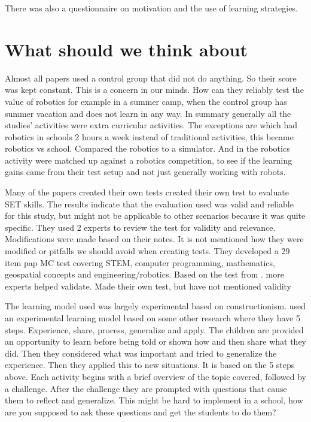 \bigskip\noindent
\cite{nugent2008effect} There was also a questionnaire on motivation and the use of learning strategies.

\section{What should we think about}
Almost all papers used a control group that did not do anything. So their score was kept constant. This is a concern in our minds. How can they reliably test the value of robotics for example in a summer camp, when the control group has summer vacation and does not learn in any way. In summary generally all the studies’ activities were extra curricular activities. The exceptions are \cite{lindh2007does} which had robotics in schools 2 hours a week instead of traditional activities, this became robotics vs school. \cite{mitnik2009collaborative} Compared the robotics to a simulator. And in \cite{silk2011resources} the robotics activity were matched up against a robotics competition, to see if the learning gains came from their test setup and not just generally working with robots.  

\bigskip\noindent
Many of the papers created their own tests
\cite{barker2007robotics} created their own test to evaluate SET skills. The results indicate that the evaluation used was valid and reliable for this study, but might not be applicable to other scenarios because it was quite specific. They used 2 experts to review the test for validity and relevance. Modifications were made based on their notes. It is not mentioned how they were modified or pitfalls we should avoid when creating tests.
\cite{nugent2008effect} They developed a 29 item pap MC test covering STEM, computer programming, mathematics, geospatial concepts and engineering/robotics. Based on the test from \cite{barker2007robotics}. more experts helped validate. 
\cite{williams2007acquisition} Made their own test, but have not mentioned validity

\bigskip\noindent
The learning model used was largely experimental based on constructionism.
\cite{barker2007robotics} used an experimental learning model based on some other research where they have 5 steps. Experience, share, process, generalize and apply. 
\cite{barker2007robotics} The children are provided an opportunity to learn before being told or shown how and then share what they did. Then they considered what was important and tried to generalize the experience. Then they applied this to new situations. It is based on the 5 steps above. 
\cite{barker2007robotics} Each activity begins with a brief overview of the topic covered, followed by a challenge. After the challenge they are prompted with questions that cause them to reflect and generalize. This might be hard to implement in a school, how are you supposed to ask these questions and get the students to do them?

